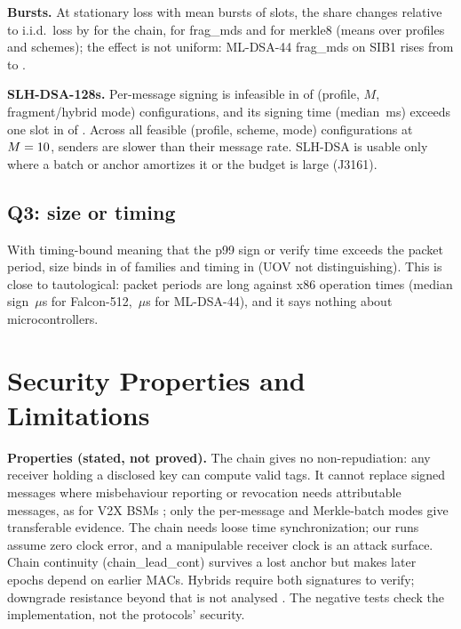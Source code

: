 \documentclass[conference]{IEEEtran}
\newcommand{\mode}[1]{\textsf{#1}}
\begin{document}
\textbf{Bursts.} At stationary loss \GELossMax{} with mean bursts of
\GEBurstMax{} slots, the share changes relative to i.i.d.\ loss by
\BurstChain{} for the chain, \BurstFragMDS{} for \mode{frag\_mds} and
\BurstMerkleEight{} for \mode{merkle8} (means over profiles and schemes);
the effect is not uniform: ML-DSA-44 \mode{frag\_mds} on SIB1 rises from
\ShMLsibFragThirty{} to \ShMLsibFragGE{}.

\textbf{SLH-DSA-128s.} Per-message signing is infeasible in \SLHInfeas{}
of \SLHConfigs{} (profile, $M$, fragment/hybrid mode) configurations, and
its signing time (median \SignMedSLHs\,ms) exceeds one slot in
\SLHSignOverSlot{} of \SLHConfigs. Across all \RTCheckN{} feasible
(profile, scheme, mode) configurations at $M=10$, \RTCheckSlow{}
senders are slower than their message rate. SLH-DSA is usable only where a batch or anchor amortizes it or the
budget is large (J3161).

\subsection{Q3: size or timing}

With timing-bound meaning that the p99 sign or verify time exceeds the
packet period, size binds in \QThreeSize{} of \QThreeFams{} families and
timing in \QThreeTime{} (UOV not distinguishing). This is close to
tautological: packet periods are long against x86 operation times (median
sign \SignMedFalcon\,$\mu$s for Falcon-512, \SignMedMLDSA\,$\mu$s for
ML-DSA-44), and it says nothing about microcontrollers.

\section{Security Properties and Limitations}
\label{sec:limits}

\textbf{Properties (stated, not proved).} The chain gives no
non-repudiation: any receiver holding a disclosed key can compute valid
tags. It cannot replace signed messages where misbehaviour reporting or
revocation needs attributable messages, as for V2X BSMs
\cite{brecht2018security}; only the per-message and Merkle-batch modes give
transferable evidence. The chain needs loose time synchronization; our runs
assume zero clock error, and a manipulable receiver clock is an attack
surface. Chain continuity (\mode{chain\_lead\_cont}) survives a lost anchor
but makes later epochs depend on earlier MACs. Hybrids require both
signatures to verify; downgrade resistance beyond that is not analysed
\cite{bindel2026hybrid}. The negative tests check the implementation, not
the protocols' security.
\end{document}
